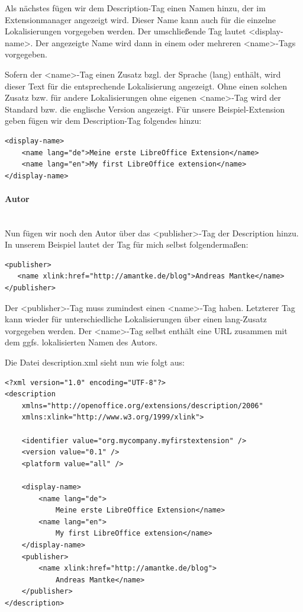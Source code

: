 \documentclass[a4paper,10pt,pagesize,titlepage]{scrbook}
\begin{document}
Als nächstes fügen wir dem Description-Tag einen Namen hinzu, der im Extensionmanager angezeigt wird. Dieser Name kann auch für die einzelne Lokalisierungen vorgegeben werden. Der umschließende Tag lautet <display-name>.
Der angezeigte Name wird dann in einem oder mehreren <name>-Tags vorgegeben.

Sofern der <name>-Tag einen Zusatz bzgl. der Sprache (lang) enthält, wird dieser Text für die entsprechende Lokalisierung angezeigt. Ohne einen solchen Zusatz bzw. für andere Lokalisierungen ohne eigenen <name>-Tag wird der Standard bzw. die englische Version angezeigt. Für unsere Beispiel-Extension geben fügen wir dem Description-Tag folgendes hinzu:
\begin{lstlisting}
<display-name>
    <name lang="de">Meine erste LibreOffice Extension</name>
    <name lang="en">My first LibreOffice extension</name>
</display-name>
\end{lstlisting}

\paragraph*{Autor}$~~$\\

Nun fügen wir noch den Autor über das <publisher>-Tag der Description hinzu. In unserem Beispiel lautet der Tag für mich selbst folgendermaßen:
\begin{lstlisting}
<publisher>
   <name xlink:href="http://amantke.de/blog">Andreas Mantke</name>
</publisher>
\end{lstlisting}
Der <publisher>-Tag muss zumindest einen <name>-Tag haben. Letzterer Tag kann wieder für unterschiedliche Lokalisierungen über einen lang-Zusatz vorgegeben werden. Der <name>-Tag selbst enthält eine URL zusammen mit dem ggfs. lokalisierten Namen des Autors.

Die Datei description.xml sieht nun wie folgt aus:
\begin{lstlisting}
<?xml version="1.0" encoding="UTF-8"?>
<description
    xmlns="http://openoffice.org/extensions/description/2006"
    xmlns:xlink="http://www.w3.org/1999/xlink">

    <identifier value="org.mycompany.myfirstextension" />
    <version value="0.1" />
    <platform value="all" />

    <display-name>
        <name lang="de">
            Meine erste LibreOffice Extension</name>
        <name lang="en">
            My first LibreOffice extension</name>
    </display-name>
    <publisher>
        <name xlink:href="http://amantke.de/blog">
            Andreas Mantke</name>
    </publisher>    
</description>
\end{lstlisting}
\end{document}
